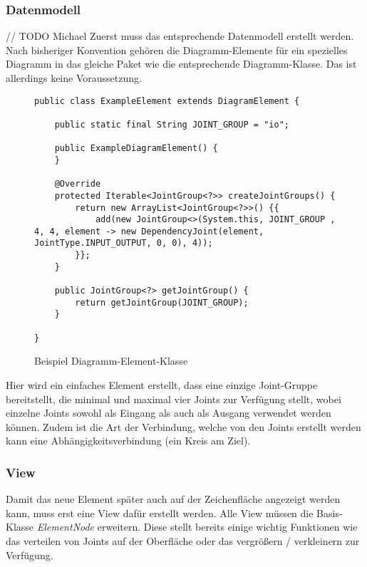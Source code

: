 \subsubsection{Datenmodell}
// TODO Michael
Zuerst muss das entsprechende Datenmodell erstellt werden. Nach bisheriger Konvention gehören die Diagramm-Elemente
für ein spezielles Diagramm in das gleiche Paket wie die entsprechende Diagramm-Klasse. Das ist allerdings keine
Voraussetzung.

\begin{figure}[h!]
	\centering
	\begin{lstlisting}
public class ExampleElement extends DiagramElement {

    public static final String JOINT_GROUP = "io";

    public ExampleDiagramElement() {
    }

    @Override
    protected Iterable<JointGroup<?>> createJointGroups() {
        return new ArrayList<JointGroup<?>>() {{
            add(new JointGroup<>(System.this, JOINT_GROUP , 4, 4, element -> new DependencyJoint(element, JointType.INPUT_OUTPUT, 0, 0), 4));
        }};
    }

    public JointGroup<?> getJointGroup() {
        return getJointGroup(JOINT_GROUP);
    }

}
	\end{lstlisting}
	\label{diagram_handler}
	\caption{Beispiel Diagramm-Element-Klasse}
\end{figure}
Hier wird ein einfaches Element erstellt, dass eine einzige Joint-Gruppe bereitstellt, die minimal und maximal
vier Joints zur Verfügung stellt, wobei einzelne Joints sowohl als Eingang als auch als Ausgang verwendet werden
können. Zudem ist die Art der Verbindung, welche von den Joints erstellt werden kann eine Abhängigkeitsverbindung
(ein Kreis am Ziel).
\subsubsection{View}
Damit das neue Element später auch auf der Zeichenfläche angezeigt werden kann, muss erst eine View dafür erstellt
werden. Alle View müssen die Basis-Klasse \textit{ElementNode} erweitern. Diese stellt bereits einige wichtig
Funktionen wie das verteilen von Joints auf der Oberfläche oder das vergrößern / verkleinern zur Verfügung.

